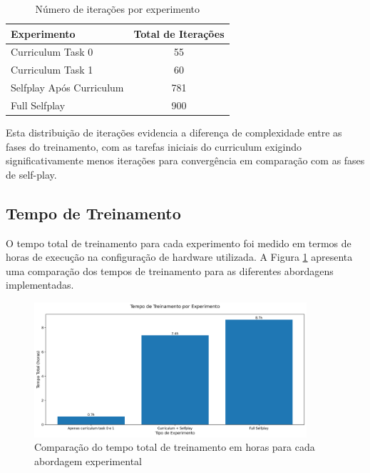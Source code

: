 \begin{table}[h]
    \centering
    \caption{Número de iterações por experimento}
    \label{tab:iteracoes_experimentos}
    \begin{tabular}{|l|c|}
        \hline
        \textbf{Experimento} & \textbf{Total de Iterações} \\
        \hline
        Curriculum Task 0 & 55 \\
        Curriculum Task 1 & 60 \\
        Selfplay Após Curriculum & 781 \\
        Full Selfplay & 900 \\
        \hline
    \end{tabular}
\end{table}

Esta distribuição de iterações evidencia a diferença de complexidade entre as fases do treinamento, com as tarefas iniciais do curriculum exigindo significativamente menos iterações para convergência em comparação com as fases de self-play.

\subsection{Tempo de Treinamento}

O tempo total de treinamento para cada experimento foi medido em termos de horas de execução na configuração de hardware utilizada. A Figura \ref{fig:tempo_treinamento} apresenta uma comparação dos tempos de treinamento para as diferentes abordagens implementadas.

\begin{figure}[H]
    \centering
    \includegraphics[width=0.9\textwidth]{fig/graficos_trabalho/graficos_experimentos/graficos_tempo_treino/tempo_treinamento.png}
    \caption{Comparação do tempo total de treinamento em horas para cada abordagem experimental}
    \label{fig:tempo_treinamento}
\end{figure}

